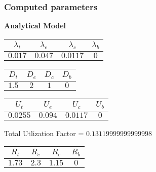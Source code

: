 \documentclass{article}
\begin{document}
\subsubsection{Computed parameters}
\begin{minipage}{0.5\textwidth}
\centering	\textbf{Analytical Model}
\begin{table}[H]
\centering
\begin{tabular}{@{}cccc@{}}
\toprule
$\lambda_t$ & $\lambda_e$ & $\lambda_c$ & $\lambda_b$\\
\midrule
$0.017$ & $0.047$ & $0.0117$ & $0$\\
\bottomrule
\end{tabular}
\end{table}\begin{table}[H]
\centering
\begin{tabular}{@{}cccc@{}}
\toprule
$D_t$ & $D_e$ & $D_c$ & $D_b$\\
\midrule
$1.5$ & $2$ & $1$ & $0$\\
\bottomrule
\end{tabular}
\end{table}\begin{table}[H]
\centering
\begin{tabular}{@{}cccc@{}}
\toprule
$U_t$ & $U_e$ & $U_c$ & $U_b$\\
\midrule
$0.0255$ & $0.094$ & $0.0117$ & $0$\\
\bottomrule
\end{tabular}
\end{table}
\centering Total Utlization Factor = $0.13119999999999998$
\begin{table}[H]
\centering
\begin{tabular}{@{}cccc@{}}
\toprule
$R_t$ & $R_e$ & $R_c$ & $R_b$\\
\midrule
$1.73$ & $2.3$ & $1.15$ & $0$\\
\bottomrule
\end{tabular}
\end{table}
\end{minipage}
\end{document}
